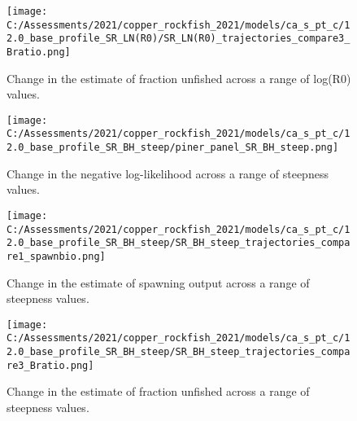 \documentclass[11pt,
  english,
  a4paper,
]{article}
\begin{document}
\tagmcend\tagstructend


\begin{figure}
\centering
\texttt{[image: C:/Assessments/2021/copper\_rockfish\_2021/models/ca\_s\_pt\_c/12.0\_base\_profile\_SR\_LN(R0)/SR\_LN(R0)\_trajectories\_compare3\_Bratio.png]}
\caption{Change in the estimate of fraction unfished across a range of log(R0) values.\label{fig:r0-depl}}
\end{figure}

\tagmcend\tagstructend


\begin{figure}
\centering
\texttt{[image: C:/Assessments/2021/copper\_rockfish\_2021/models/ca\_s\_pt\_c/12.0\_base\_profile\_SR\_BH\_steep/piner\_panel\_SR\_BH\_steep.png]}
\caption{Change in the negative log-likelihood across a range of steepness values.\label{fig:h-profile}}
\end{figure}

\tagmcend\tagstructend


\begin{figure}
\centering
\texttt{[image: C:/Assessments/2021/copper\_rockfish\_2021/models/ca\_s\_pt\_c/12.0\_base\_profile\_SR\_BH\_steep/SR\_BH\_steep\_trajectories\_compare1\_spawnbio.png]}
\caption{Change in the estimate of spawning output across a range of steepness values.\label{fig:h-ssb}}
\end{figure}

\tagmcend\tagstructend


\begin{figure}
\centering
\texttt{[image: C:/Assessments/2021/copper\_rockfish\_2021/models/ca\_s\_pt\_c/12.0\_base\_profile\_SR\_BH\_steep/SR\_BH\_steep\_trajectories\_compare3\_Bratio.png]}
\caption{Change in the estimate of fraction unfished across a range of steepness values.\label{fig:h-depl}}
\end{figure}
\end{document}
